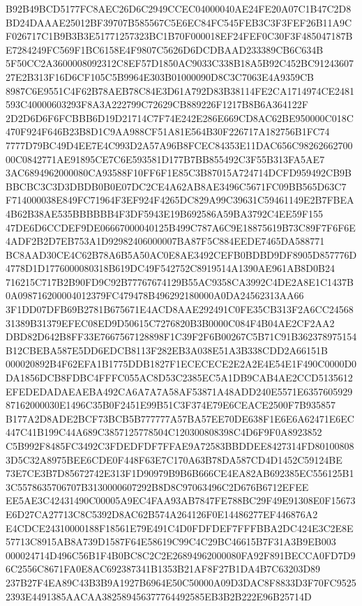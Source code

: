 \documentclass[UTF8,fontset=fandol,zihao=-4,a4paper]{ctexart}
\begin{document}
{{B92B49BCD5177FC8AEC26D6C2949CCEC04000040AE24FE20A07C1B47C2D8BD24DAAAE25012BF39707B585567C5E6EC84FC545FEB3C3F3FEF26B11A9C
F026717C1B9B3B3E51771257323BC1B70F000018EF24FEF0C30F3F485047187BE7284249FC569F1BC6158E4F9807C5626D6DCDBAAD233389CB6C634B
5F50CC2A3600008092312C8EF57D1850AC9033C338B18A5B92C452BC9124360727E2B313F16D6CF105C5B9964E303B01000090D8C3C7063E4A9359CB
8987C6E9551C4F62B78AEB78C84E3D61A792D83B38114FE2CA1714974CE2481593C40000603293F8A3A222799C72629CB889226F1217B8B6A364122F
2D2D6D6F6FCBBB6D19D21714C7F74E242E286E669CD8AC62BE950000C018C470F924F646B23B8D1C9AA988CF51A81E564B30F226717A182756B1FC74
7777D79BC49D4EE7E4C993D2A57A96B8FCEC84353E11DAC656C9826266270000C0842771AE91895CE7C6E593581D177B7BB855492C3F55B313FA5AE7
3AC6894962000080CA93588F10FF6F1E85C3B87015A724714DCFD959492CB9BBBCBC3C3D3DBDB0B0E07DC2CE4A62AB8AE3496C5671FC09BB565D63C7
F714000038E849FC71964F3EF924F4265DC829A99C39631C59461149E2B7FBEA4B62B38AE535BBBBBB4F3DF5943E19B692586A59BA3792C4EE59F155
47DE6D6CCDEF9DE06667000040125B499C787A6C9E18875619B73C89F7F6F6E4ADF2B2D7EB753A1D92982406000007BA87F5C884EEDE7465DA588771
BC8AAD30CE4C62B78A6B5A50AC0E8AE3492CEFB0BDBD9DF8905D857776D4778D1D1776000080318B619DC49F542752C8919514A1390AE961AB8D0B24
716215C717B2B90FD9C92B77767674129B55AC9358CA3992C4DE2A8E1C1437B0A098716200004012379FC479478B496292180000A0DA24562313AA66
3F1DD07DFB69B2781B675671E4ACD8AAE292491C0FE35CB313F2A6CC2456831389B31379EFEC08ED9D50615C7276820B3B0000C084F4B04AE2CF2AA2
DBD82D642B8FF33E7667567128898F1C39F2F6B00267C5B71C91B362378975154B12CBEBA587E5DD6EDCB8113F282EB3A038E51A3B338CDD2A66151B
000020892B4F62EFA1B1775DDB1827F1ECECECE2E2A2E4E54E1F490C0000D0DA1856DCB8FDBC4FFFC055AC8D53C2385EC5A1DB9CAB4AE2CCD5135612
EFEDEDADAEAEBA492CA6A7A7A58AF53871A48ADD240E5571E635760592987162000030E1496C35B0F2451E99B51C3F374E79E6CEACE2500F7B935857
B177A2D8ADE2BCF73BCB5B777777A57BA57EE70DE638F1E6E6A62471E6EC447C41B199C44A689C3857125778504C120300808398C4D6F9F0A8923852
C5B992F8485FC3492C3FDEDFDF7FFAE9A72583BBDDEE8427314FD801008083D5C32A8975BEE6CDE0F448F63E7C170A63B78DA587CD4D1452C59124BE
73E7CE3B7D85672742E313F1D90979B9B6B666CE4EA82AB692385EC556125B13C5578635706707B3130000607292B8D8C97063496C2D676B6712EFEE
EE5AE3C42431490C00005A9EC4FAA93AB7847FE788BC29F49E91308E0F15673E6D27CA27713C8C5392D8AC62B574A264126F0E14486277EF446876A2
E4CDCE24310000188F18561E79E491C4D0FDFDEF7FFFBBA2DC424E3C2E8E57713C8915AB8A739D1587F64E58619C99C4C29BC46615B7F31A3B9EB003
000024714D496C56B1F4B0BC8C2C2E26894962000080FA92F891BECCA0FD7D96C2556C8671FA0E8AC692387341B1353B21AF8F27B1DA4B7C63203D89
237B27F4EA89C43B3B9A1927B6964E50C50000A09D3DAC8F8833D3F70FC95252393E4491385AACAA382589456377764492585EB3B2B222E96B25714D
}}
\end{document}
